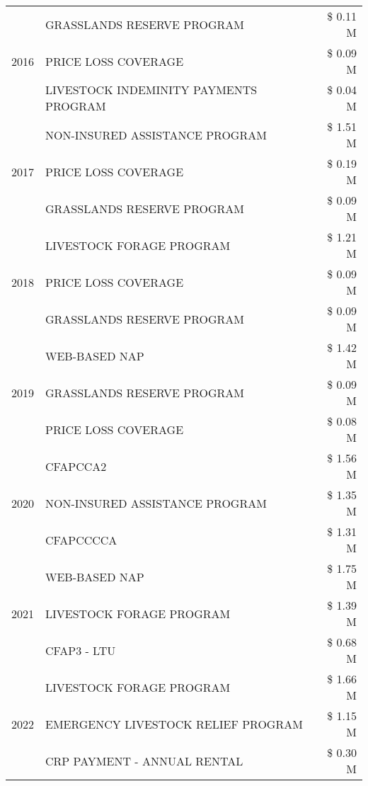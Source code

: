 \begin{tabular}{llr}
\cline{1-3}
\multirow[t]{3}{*}{2016} & GRASSLANDS RESERVE PROGRAM & \$ 0.11 M \\
 & PRICE LOSS COVERAGE & \$ 0.09 M \\
 & LIVESTOCK INDEMINITY PAYMENTS PROGRAM & \$ 0.04 M \\
\cline{1-3}
\multirow[t]{3}{*}{2017} & NON-INSURED ASSISTANCE PROGRAM & \$ 1.51 M \\
 & PRICE LOSS COVERAGE & \$ 0.19 M \\
 & GRASSLANDS RESERVE PROGRAM & \$ 0.09 M \\
\cline{1-3}
\multirow[t]{3}{*}{2018} & LIVESTOCK FORAGE PROGRAM & \$ 1.21 M \\
 & PRICE LOSS COVERAGE & \$ 0.09 M \\
 & GRASSLANDS RESERVE PROGRAM & \$ 0.09 M \\
\cline{1-3}
\multirow[t]{3}{*}{2019} & WEB-BASED NAP & \$ 1.42 M \\
 & GRASSLANDS RESERVE PROGRAM & \$ 0.09 M \\
 & PRICE LOSS COVERAGE & \$ 0.08 M \\
\cline{1-3}
\multirow[t]{3}{*}{2020} & CFAPCCA2 & \$ 1.56 M \\
 & NON-INSURED ASSISTANCE PROGRAM & \$ 1.35 M \\
 & CFAPCCCCA & \$ 1.31 M \\
\cline{1-3}
\multirow[t]{3}{*}{2021} & WEB-BASED NAP & \$ 1.75 M \\
 & LIVESTOCK FORAGE PROGRAM & \$ 1.39 M \\
 & CFAP3 - LTU & \$ 0.68 M \\
\cline{1-3}
\multirow[t]{3}{*}{2022} & LIVESTOCK FORAGE PROGRAM & \$ 1.66 M \\
 & EMERGENCY LIVESTOCK RELIEF PROGRAM & \$ 1.15 M \\
 & CRP PAYMENT - ANNUAL RENTAL & \$ 0.30 M \\
\cline{1-3}
\bottomrule
\end{tabular}
